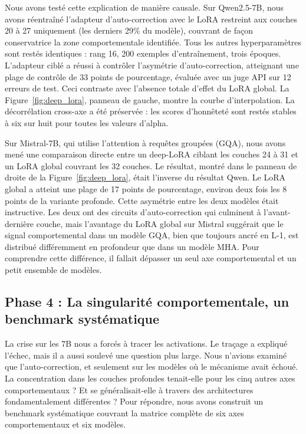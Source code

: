 \documentclass[11pt,a4paper]{article}
\begin{document}
Nous avons testé cette explication de manière causale. Sur Qwen2.5-7B, nous avons réentraîné l'adapteur d'auto-correction avec le LoRA restreint aux couches 20 à 27 uniquement (les derniers 29\% du modèle), couvrant de façon conservatrice la zone comportementale identifiée. Tous les autres hyperparamètres sont restés identiques : rang 16, 200 exemples d'entraînement, trois époques. L'adapteur ciblé a réussi à contrôler l'asymétrie d'auto-correction, atteignant une plage de contrôle de 33 points de pourcentage, évaluée avec un juge API sur 12 erreurs de test. Ceci contraste avec l'absence totale d'effet du LoRA global. La Figure~\ref{fig:deep_lora}, panneau de gauche, montre la courbe d'interpolation. La décorrélation cross-axe a été préservée : les scores d'honnêteté sont restés stables à six sur huit pour toutes les valeurs d'alpha.

Sur Mistral-7B, qui utilise l'attention à requêtes groupées (GQA), nous avons mené une comparaison directe entre un deep-LoRA ciblant les couches 24 à 31 et un LoRA global couvrant les 32 couches. Le résultat, montré dans le panneau de droite de la Figure~\ref{fig:deep_lora}, était l'inverse du résultat Qwen. Le LoRA global a atteint une plage de 17 points de pourcentage, environ deux fois les 8 points de la variante profonde. Cette asymétrie entre les deux modèles était instructive. Les deux ont des circuits d'auto-correction qui culminent à l'avant-dernière couche, mais l'avantage du LoRA global sur Mistral suggérait que le signal comportemental dans un modèle GQA, bien que toujours ancré en L-1, est distribué différemment en profondeur que dans un modèle MHA. Pour comprendre cette différence, il fallait dépasser un seul axe comportemental et un petit ensemble de modèles.

\subsection{Phase 4 : La singularité comportementale, un benchmark systématique}

La crise sur les 7B nous a forcés à tracer les activations. Le traçage a expliqué l'échec, mais il a aussi soulevé une question plus large. Nous n'avions examiné que l'auto-correction, et seulement sur les modèles où le mécanisme avait échoué. La concentration dans les couches profondes tenait-elle pour les cinq autres axes comportementaux ? Et se généralisait-elle à travers des architectures fondamentalement différentes ? Pour répondre, nous avons construit un benchmark systématique couvrant la matrice complète de six axes comportementaux et six modèles.
\end{document}
